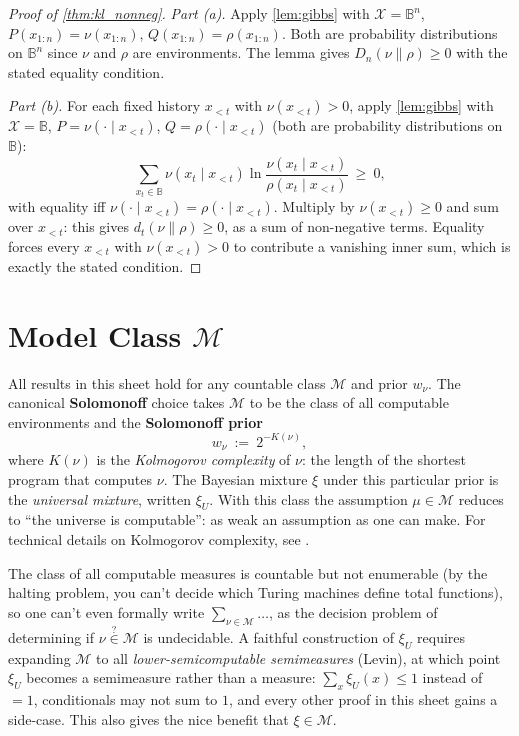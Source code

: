 \documentclass[fontsize=11pt, parskip=half]{scrartcl}
\newcommand{\Mc}{\mathcal{M}}
\begin{document}
\begin{proof}[Proof of \cref{thm:kl_nonneg}]
\textit{Part (a).} Apply \cref{lem:gibbs} with $\mathcal{X} = \mathbb{B}^n$, $P(x_{1:n}) = \nu(x_{1:n})$, $Q(x_{1:n}) = \rho(x_{1:n})$. Both are probability distributions on $\mathbb{B}^n$ since $\nu$ and $\rho$ are environments. The lemma gives $D_n(\nu \parallel \rho) \geq 0$ with the stated equality condition.

\textit{Part (b).} For each fixed history $x_{<t}$ with $\nu(x_{<t}) > 0$, apply \cref{lem:gibbs} with $\mathcal{X} = \mathbb{B}$, $P = \nu(\cdot \mid x_{<t})$, $Q = \rho(\cdot \mid x_{<t})$ (both are probability distributions on $\mathbb{B}$):
\[
  \sum_{x_t \in \mathbb{B}} \nu(x_t \mid x_{<t}) \ln \frac{\nu(x_t \mid x_{<t})}{\rho(x_t \mid x_{<t})} ~\geq~ 0,
\]
with equality iff $\nu(\cdot \mid x_{<t}) = \rho(\cdot \mid x_{<t})$. Multiply by $\nu(x_{<t}) \geq 0$ and sum over $x_{<t}$: this gives $d_t(\nu \parallel \rho) \geq 0$, as a sum of non-negative terms. Equality forces every $x_{<t}$ with $\nu(x_{<t}) > 0$ to contribute a vanishing inner sum, which is exactly the stated condition.
\end{proof}


\section{Model Class $\Mc$}\label{app:model_class}

All results in this sheet hold for any countable class $\Mc$ and prior $w_\nu$. The canonical \textbf{Solomonoff} choice takes $\Mc$ to be the class of all computable environments and the \textbf{Solomonoff prior}
\[
w_\nu ~:=~ 2^{-K(\nu)},
\]
where $K(\nu)$ is the \emph{Kolmogorov complexity} of $\nu$: the length of the shortest program that computes $\nu$. The Bayesian mixture $\xi$ under this particular prior is the \emph{universal mixture}, written $\xi_U$. With this class the assumption $\mu \in \Mc$ reduces to ``the universe is computable'': as weak an assumption as one can make. For technical details on Kolmogorov complexity, see \cite[\S2.7]{Hutter:24uaibook2}.

The class of all computable measures is countable but not enumerable (by the halting problem, you can't decide which Turing machines define total functions), so one can't even formally write
$\sum_{\nu \in \Mc} \ldots$, as the decision problem of determining if $\nu \overset{?}{\in} \Mc$ is undecidable. A faithful construction of $\xi_U$ requires expanding $\Mc$ to all \emph{lower-semicomputable semimeasures} (Levin), at which point $\xi_U$ becomes a semimeasure rather than a measure: $\sum_x \xi_U(x) \leq 1$ instead of $=1$, conditionals may not sum to $1$, and every other proof in this sheet gains a side-case. This also gives the nice benefit that $\xi \in \mathcal{M}$.
\end{document}

